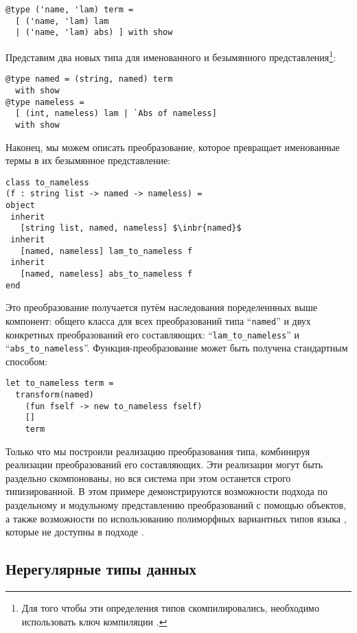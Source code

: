 \begin{lstlisting}
@type ('name, 'lam) term = 
  [ ('name, 'lam) lam 
  | ('name, 'lam) abs) ] with show
\end{lstlisting}

Представим два новых типа для именованного и безымянного представления\footnote{Для того чтобы эти определения типов скомпилировались, необходимо использовать ключ компиляции .}:

\begin{lstlisting}
@type named = (string, named) term 
  with show
@type nameless = 
  [ (int, nameless) lam | `Abs of nameless] 
  with show
\end{lstlisting}

Наконец, мы можем описать преобразование, которое превращает именованные термы в их безымянное представление:

\begin{lstlisting}
class to_nameless
(f : string list -> named -> nameless) = 
object
 inherit 
   [string list, named, nameless] $\inbr{named}$
 inherit 
   [named, nameless] lam_to_nameless f
 inherit 
   [named, nameless] abs_to_nameless f
end
\end{lstlisting}

Это преобразование получается путём наследования поределеннных выше компонент: общего класса для всех преобразований типа ``\lstinline{named}'' 
и двух конкретных преобразований его составляющих: 
``\lstinline{lam_to_nameless}'' и ``\lstinline{abs_to_nameless}''.
Функция-преобразование может быть получена стандартным способом:

\begin{lstlisting}
let to_nameless term =
  transform(named) 
    (fun fself -> new to_nameless fself) 
    [] 
    term
\end{lstlisting}

Только что мы построили реализацию преобразования типа, комбинируя реализации преобразований его составляющих. Эти  реализации могут быть раздельно скомпонованы, но вся система при этом останется строго типизированной. В этом примере демонстрируются возможности подхода по раздельному и модульному представлению преобразований с помощью объектов, а также возможности по использованию полиморфных вариантных типов языка \ocaml{}, которые не доступны в подходе \visitors{}.

\subsection{Нерегулярные типы данных}
\label{sec:irregular}


